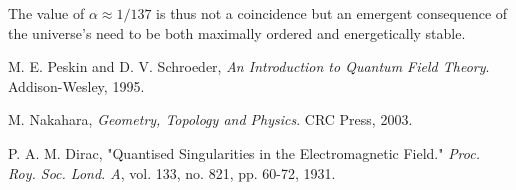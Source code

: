 \documentclass[12pt, a4paper]{article}
\begin{document}
The value of \( \alpha \approx 1/137 \) is thus not a coincidence but an emergent consequence of the universe's need to be both maximally ordered and energetically stable.

\begin{thebibliography}{9}

M. E. Peskin and D. V. Schroeder,
\textit{An Introduction to Quantum Field Theory}.
Addison-Wesley, 1995.

M. Nakahara,
\textit{Geometry, Topology and Physics}.
CRC Press, 2003.

P. A. M. Dirac,
"Quantised Singularities in the Electromagnetic Field."
\textit{Proc. Roy. Soc. Lond. A}, vol. 133, no. 821, pp. 60-72, 1931.

\end{thebibliography}
\end{document}
